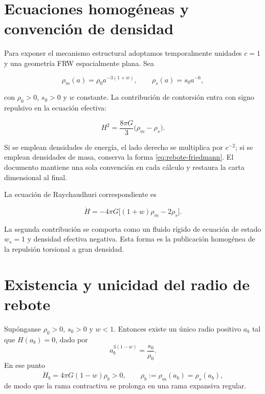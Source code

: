 \section{Ecuaciones homog\'eneas y convenci\'on de densidad}

Para exponer el mecanismo estructural adoptamos temporalmente unidades
\(c=1\) y una geometr\'ia FRW espacialmente plana.  Sea

\begin{equation}
 \rho_m(a)=\rho_0a^{-3(1+w)},
 \qquad
 \rho_s(a)=s_0a^{-6},
 \label{eq:rebote-densities}
\end{equation}

con \(\rho_0>0\), \(s_0>0\) y \(w\) constante.  La contribuci\'on de
contorsi\'on entra con signo repulsivo en la ecuaci\'on efectiva:

\begin{equation}
 H^2=\frac{8\pi G}{3}\bigl(\rho_m-\rho_s\bigr).
 \label{eq:rebote-friedmann}
\end{equation}

Si se emplean densidades de energ\'ia, el lado derecho se multiplica por
\(c^{-2}\); si se emplean densidades de masa, conserva la forma
\cref{eq:rebote-friedmann}.  El documento mantiene una sola convenci\'on en
cada c\'alculo y restaura la carta dimensional al final.

La ecuaci\'on de Raychaudhuri correspondiente es

\begin{equation}
 \dot H=-4\pi G\bigl[(1+w)\rho_m-2\rho_s\bigr].
 \label{eq:rebote-raychaudhuri}
\end{equation}

La segunda contribuci\'on se comporta como un fluido r\'igido de ecuaci\'on de
estado \(w_s=1\) y densidad efectiva negativa.  Esta forma es la publicaci\'on
homog\'enea de la repulsi\'on torsional a gran densidad.

\section{Existencia y unicidad del radio de rebote}

\begin{theorem}
Sup\'onganse \(\rho_0>0\), \(s_0>0\) y \(w<1\).  Entonces existe un \'unico
radio positivo \(a_b\) tal que \(H(a_b)=0\), dado por
\begin{equation}
 \boxed{
 a_b^{3(1-w)}=\frac{s_0}{\rho_0}.}
 \label{eq:rebote-radius}
\end{equation}
En ese punto
\begin{equation}
 \boxed{
 \dot H_b=4\pi G(1-w)\rho_b>0,}
 \qquad
 \rho_b:=\rho_m(a_b)=\rho_s(a_b),
 \label{eq:rebote-positive-derivative}
\end{equation}
de modo que la rama contractiva se prolonga en una rama expansiva regular.
\end{theorem}

